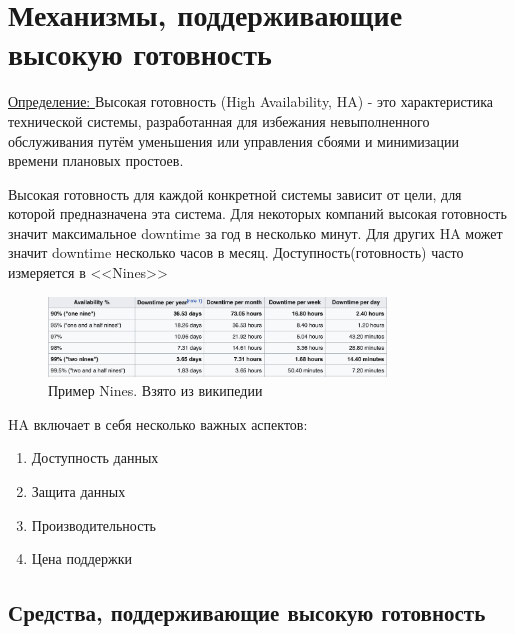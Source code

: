 \section{Механизмы, поддерживающие высокую готовность}

\underline{Определение: } Высокая готовность (High Availability, HA) - это характеристика технической системы, разработанная для избежания невыполненного обслуживания путём уменьшения или управления сбоями и минимизации времени плановых простоев. 

Высокая готовность для каждой конкретной системы зависит от цели, для которой предназначена эта система. Для некоторых компаний высокая готовность значит максимальное downtime за год в несколько минут. Для других HA может значит downtime несколько часов в месяц.
Доступность(готовность) часто измеряется в <<Nines>>
\begin{figure}[h]
    \centering
    \includegraphics[width=0.8\textwidth]{assets/avail.png}
    \caption{Пример Nines. Взято из википедии}
    \label{fig:mesh1}
\end{figure}

HA включает в себя несколько важных аспектов:
\begin{enumerate}
    \item Доступность данных 
    \item Защита данных
    \item Производительность
    \item Цена поддержки
\end{enumerate}
\subsection{Средства, поддерживающие высокую готовность}
